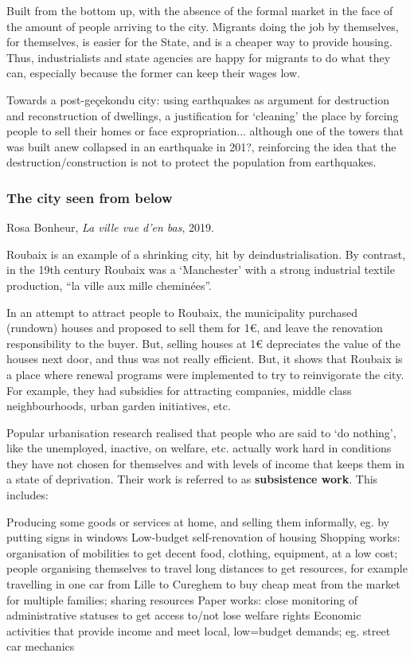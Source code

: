 \documentclass{article}
\begin{document}
Built from the bottom up, with the absence of the formal market in the face of the amount of people arriving to the city. Migrants doing the job by themselves, for themselves, is easier for the State, and is a cheaper way to provide housing.
Thus, industrialists and state agencies are happy for migrants to do what they can, especially because the former can keep their wages low.

Towards a post-geçekondu city: using earthquakes as argument for destruction and reconstruction of dwellings, a justification for `cleaning' the place by forcing people to sell their homes or face expropriation... although one of the towers that was built anew collapsed in an earthquake in 201?, reinforcing the idea that the destruction/construction is not to protect the population from earthquakes.

\subsubsection{The city seen from below}

Rosa Bonheur, \textit{La ville vue d'en bas}, 2019.

Roubaix is an example of a shrinking city, hit by deindustrialisation. By contrast, in the 19th century Roubaix was a `Manchester' with a strong industrial textile production, ``la ville aux mille cheminées''. 

In an attempt to attract people to Roubaix, the municipality purchased (rundown) houses and proposed to sell them for 1€, and leave the renovation responsibility to the buyer. But, selling houses at 1€ depreciates the value of the houses next door, and thus was not really efficient. But, it shows that Roubaix is a place where renewal programs were implemented to try to reinvigorate the city. For example, they had subsidies for attracting companies, middle class neighbourhoods, urban garden initiatives, etc.

Popular urbanisation research realised that people who are said to `do nothing', like the unemployed, inactive, on welfare, etc. actually work hard in conditions they have not chosen for themselves and with levels of income that keeps them in a state of deprivation. Their work is referred to as \textbf{subsistence work}. This includes:

\begin{outline}
	\1 Producing some goods or services at home, and selling them informally, eg. by putting signs in windows
	\1 Low-budget self-renovation of housing
	\1 Shopping works: organisation of mobilities to get decent food, clothing, equipment, at a low cost; people organising themselves to travel long distances to get resources, for example travelling in one car from Lille to Cureghem to buy cheap meat from the market for multiple families; sharing resources
	\1 Paper works: close monitoring of administrative statuses to get access to/not lose welfare rights
	\1 Economic activities that provide income and meet local, low=budget demands; eg. street car mechanics
\end{outline}
\end{document}
